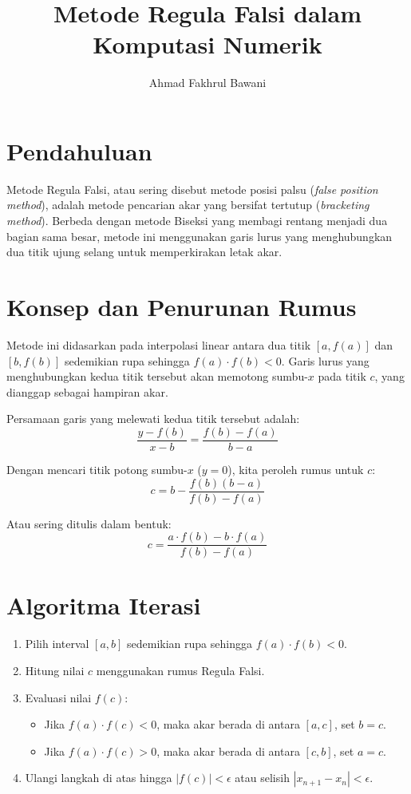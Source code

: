 \documentclass[12pt,a4paper]{article}
\title{Metode Regula Falsi dalam Komputasi Numerik}
\author{Ahmad Fakhrul Bawani}
\date{}
\begin{document}
\maketitle

\section{Pendahuluan}
Metode Regula Falsi, atau sering disebut metode posisi palsu (\textit{false position method}), adalah metode pencarian akar yang bersifat tertutup (\textit{bracketing method}). Berbeda dengan metode Biseksi yang membagi rentang menjadi dua bagian sama besar, metode ini menggunakan garis lurus yang menghubungkan dua titik ujung selang untuk memperkirakan letak akar.

\section{Konsep dan Penurunan Rumus}
Metode ini didasarkan pada interpolasi linear antara dua titik $[a, f(a)]$ dan $[b, f(b)]$ sedemikian rupa sehingga $f(a) \cdot f(b) < 0$. Garis lurus yang menghubungkan kedua titik tersebut akan memotong sumbu-$x$ pada titik $c$, yang dianggap sebagai hampiran akar.

Persamaan garis yang melewati kedua titik tersebut adalah:
\begin{equation}
\frac{y - f(b)}{x - b} = \frac{f(b) - f(a)}{b - a}
\end{equation}

Dengan mencari titik potong sumbu-$x$ ($y=0$), kita peroleh rumus untuk $c$:
\begin{equation}
c = b - \frac{f(b)(b - a)}{f(b) - f(a)}
\end{equation}

Atau sering ditulis dalam bentuk:
\begin{equation}
c = \frac{a \cdot f(b) - b \cdot f(a)}{f(b) - f(a)}
\end{equation}

\section{Algoritma Iterasi}
\begin{enumerate}
  \item Pilih interval $[a, b]$ sedemikian rupa sehingga $f(a) \cdot f(b) < 0$.
  \item Hitung nilai $c$ menggunakan rumus Regula Falsi.
	\item Evaluasi nilai $f(c)$:
  \begin{itemize}
    \item Jika $f(a) \cdot f(c) < 0$, maka akar berada di antara $[a, c]$, set $b = c$.
    \item Jika $f(a) \cdot f(c) > 0$, maka akar berada di antara $[c, b]$, set $a = c$.
  \end{itemize}
  \item Ulangi langkah di atas hingga $|f(c)| < \epsilon$ atau selisih $|x_{n+1} - x_n| < \epsilon$.
\end{enumerate}
\end{document}
